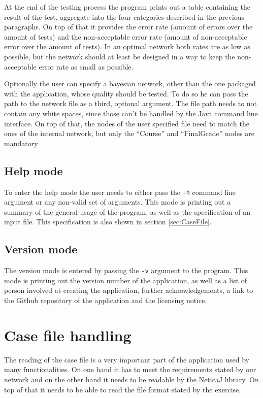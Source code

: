 \documentclass[%
	pdftex,
	oneside,        %
	11pt,           %
	parskip=half,   %
	headsepline,    %
	footsepline,    %
	abstracton,     %
	USenglish,      %
	a4paper,        %
]{report}
\begin{document}
At the end of the testing process the program prints out a table containing the result of the test, aggregate into the four categories described in the previous paragraphs. On top of that it provides the error rate (amount of errors over the amount of tests) and the non-acceptable error rate (amount of non-acceptable error over the amount of tests). In an optimal network both rates are as low as possible, but the network should at least be designed in a way to keep the non-acceptable error rate as small as possible.

Optionally the user can specify a bayesian network, other than the one packaged with the application, whose quality should be tested. To do so he can pass the path to the network file as a third, optional argument. The file path needs to not contain any white spaces, since those can't be handled by the Java command line interface. On top of that, the nodes of the user specified file need to match the ones of the internal network, but only the \enquote{Course} and \enquote{FinalGrade} nodes are mandatory

\subsection{Help mode}
\label{sec:Help}
To enter the help mode the user needs to either pass the \texttt{-h} command line argument or any non-valid set of arguments. This mode is printing out a summary of the general usage of the program, as well as the specification of an input file. This specification is also shown in section \vref{sec:CaseFile}.

\subsection{Version mode}
The version mode is entered by passing the \texttt{-v} argument to the program. This mode is printing out the version number of the application, as well as a list of person involved at creating the application, further acknowledgements, a link to the Github repository of the application and the licensing notice.

\section{Case file handling}
\label{sec:CaseFile}
The reading of the case file is a very important part of the application used by many functionalities. On one hand it has to meet the requirements stated by our network and on the other hand it needs to be readable by the NeticaJ library. On top of that it needs to be able to read the file format stated by the exercise. 
\end{document}
